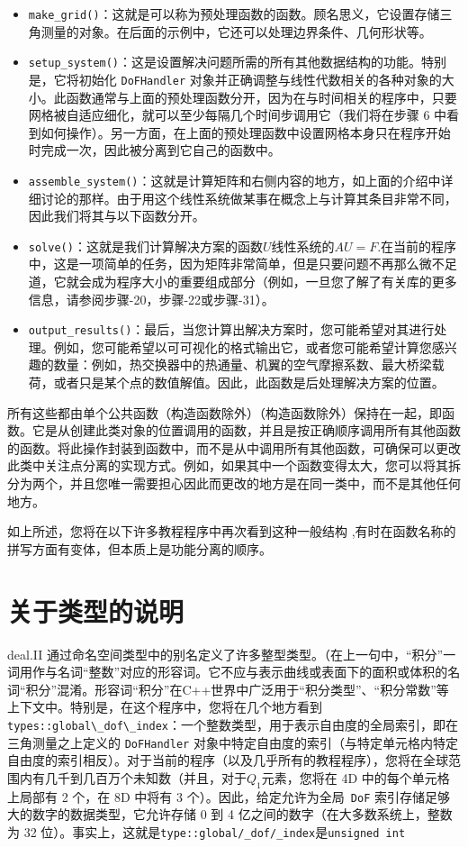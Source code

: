 \documentclass[12pt, a4paper]{article}
\numberwithin{equation}{section} %
\begin{document}
\begin{itemize}
    \item \verb|make_grid()|：这就是可以称为预处理函数的函数。顾名思义，它设置存储三角测量的对象。在后面的示例中，它还可以处理边界条件、几何形状等。
    \item \verb|setup_system()|：这是设置解决问题所需的所有其他数据结构的功能。特别是，它将初始化 \verb|DoFHandler| 对象并正确调整与线性代数相关的各种对象的大小。此函数通常与上面的预处理函数分开，因为在与时间相关的程序中，只要网格被自适应细化，就可以至少每隔几个时间步调用它（我们将在步骤 6 中看到如何操作）。另一方面，在上面的预处理函数中设置网格本身只在程序开始时完成一次，因此被分离到它自己的函数中。
    \item \verb|assemble_system()|：这就是计算矩阵和右侧内容的地方，如上面的介绍中详细讨论的那样。由于用这个线性系统做某事在概念上与计算其条目非常不同，因此我们将其与以下函数分开。
    \item \verb|solve()|：这就是我们计算解决方案的函数$U$线性系统的$AU=F$.在当前的程序中，这是一项简单的任务，因为矩阵非常简单，但是只要问题不再那么微不足道，它就会成为程序大小的重要组成部分（例如，一旦您了解了有关库的更多信息，请参阅步骤-20，步骤-22或步骤-31）。
    \item \verb|output_results()|：最后，当您计算出解决方案时，您可能希望对其进行处理。例如，您可能希望以可可视化的格式输出它，或者您可能希望计算您感兴趣的数量：例如，热交换器中的热通量、机翼的空气摩擦系数、最大桥梁载荷，或者只是某个点的数值解值。因此，此函数是后处理解决方案的位置。
\end{itemize}

所有这些都由单个公共函数（构造函数除外）（构造函数除外）保持在一起，即函数。它是从创建此类对象的位置调用的函数，并且是按正确顺序调用所有其他函数的函数。将此操作封装到函数中，而不是从中调用所有其他函数，可确保可以更改此类中关注点分离的实现方式。例如，如果其中一个函数变得太大，您可以将其拆分为两个，并且您唯一需要担心因此而更改的地方是在同一类中，而不是其他任何地方。

如上所述，您将在以下许多教程程序中再次看到这种一般结构 ,有时在函数名称的拼写方面有变体，但本质上是功能分离的顺序。


\newpage
\section{关于类型的说明}

deal.II 通过命名空间类型中的别名定义了许多整型类型。（在上一句中，“积分”一词用作与名词“整数”对应的形容词。它不应与表示曲线或表面下的面积或体积的名词“积分”混淆。形容词“积分”在C++世界中广泛用于“积分类型”、“积分常数”等上下文中。特别是，在这个程序中，您将在几个地方看到 \verb|types::global\_dof\_index|：一个整数类型，用于表示自由度的全局索引，即在三角测量之上定义的 \verb|DoFHandler| 对象中特定自由度的索引（与特定单元格内特定自由度的索引相反）。对于当前的程序（以及几乎所有的教程程序），您将在全球范围内有几千到几百万个未知数（并且，对于$Q_1$元素，您将在 4D 中的每个单元格上局部有 2 个，在 8D 中将有 3 个）。因此，给定允许为全局\verb| DoF| 索引存储足够大的数字的数据类型，它允许存储 0 到 4 亿之间的数字（在大多数系统上，整数为 32 位）。事实上，这就是\verb|type::global/_dof/_index|是\verb|unsigned int|
\end{document}
